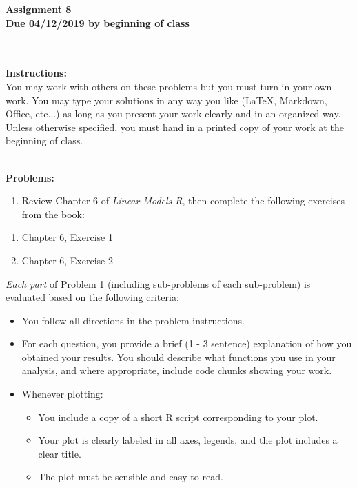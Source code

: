 \documentclass[11pt,a4paper]{article}
\begin{document}
\begin{center}
{\huge\textbf{Assignment 8
\\\vspace{5mm} Due 04/12/2019 by beginning of class }} \\
\hfill\\
\end{center}
\hfill\\
\noindent
{\large \textbf{Instructions:}}\\
You may work with others on these problems but you must turn in your own work.  You may type your solutions in any way you like (LaTeX, Markdown, Office, etc...) as long as you present your work clearly and in an organized way.\\

\noindent
Unless otherwise specified, you must hand in a printed copy of your work at the beginning of class.

\hfill\\
\noindent
{\large \textbf{Problems:}}\\
\begin{enumerate}[{1}]
	\item Review Chapter 6 of \emph{Linear Models R}, then complete the following exercises from the book:
\end{enumerate}
\begin{enumerate}[{1}.1]
	\item Chapter 6, Exercise 1
	\item Chapter 6, Exercise 2
\end{enumerate}
\emph{Each part} of Problem 1 (including sub-problems of each sub-problem) is evaluated based on the following criteria:
	\begin{itemize}
		\item You follow all directions in the problem instructions.
		\item For each question, you provide a brief (1 - 3 sentence) explanation of how you obtained your results.	 You should describe what functions you use in your analysis, and where appropriate, include code chunks showing your work.	
		\item Whenever plotting:
		\begin{itemize}
		\item You include a copy of a short R script corresponding to your plot.
		\item Your plot is clearly labeled in all axes, legends, and the plot includes a clear title.  
		\item The plot must be sensible and easy to read.
		\end{itemize}
	\end{itemize}
\end{document}
